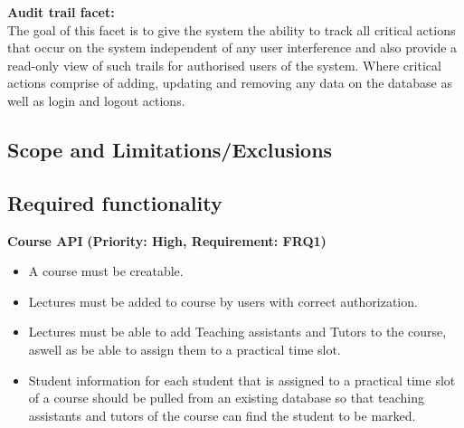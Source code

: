 \documentclass[12pt]{article}
\begin{document}
\begin{flushleft}
				\vspace{0.5cm}
				\textbf{Audit trail facet:}
				\vspace{0.1in}
				\\
				The goal of this facet is to give the system the ability to track all critical actions that occur on the system independent of any user interference and also provide a read-only view of such trails for authorised users of the system. Where critical actions comprise of adding, updating and removing any data on the database as well as login and logout actions.
	
				\vspace{0.2in}
			\end{flushleft}
			
		\subsection{Scope and Limitations/Exclusions}
		
			\vspace{0.2in}
			
			
		
		\subsection{Required functionality}
		
			\vspace{0.2in}
			
			\begin{flushleft}
				\textbf{Course API}
				\newline\textbf{(Priority: High, Requirement: FRQ1)}
			\end{flushleft}
			
			\vspace{0.05in}
			
				\begin{itemize}
					\item A course must be creatable.
					\item Lectures must be added to course by users with correct authorization.
					\item Lectures must be able to add Teaching assistants and Tutors to the course, aswell as be able to assign them to a practical time slot.
					\item Student information for each student that is assigned to a practical time slot of a course should be pulled from an existing database so that teaching assistants and tutors of the course can find the student to be marked.
				\end{itemize}
				
\end{document}
